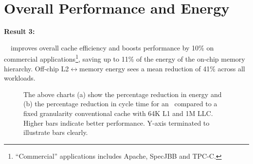 {\section{Overall Performance and Energy}
\label{sec:overall_performance_and_energy}
\noindent \textbf{Result 3:}{~\AC\ improves overall cache efficiency and boosts performance by 10\% on commercial applications\footnote{``Commercial'' applications includes Apache, SpecJBB and TPC-C.}, saving up to 11\% of the energy of the on-chip memory hierarchy. Off-chip L2$\leftrightarrow$memory energy sees a mean reduction of 41\% across all workloads. 

\begin{figure}[!h]
  \centering
    
    \caption[Overall performance and energy]{The above charts (a) show the percentage reduction in energy and (b) the percentage reduction in cycle time for an \AC\ compared to a fixed granularity conventional cache with 64K L1 and 1M LLC. Higher bars indicate better performance. Y-axis terminated to illustrate bars clearly.}
    \label{plot:multi_sys_perf_energy}
\end{figure}

}}

